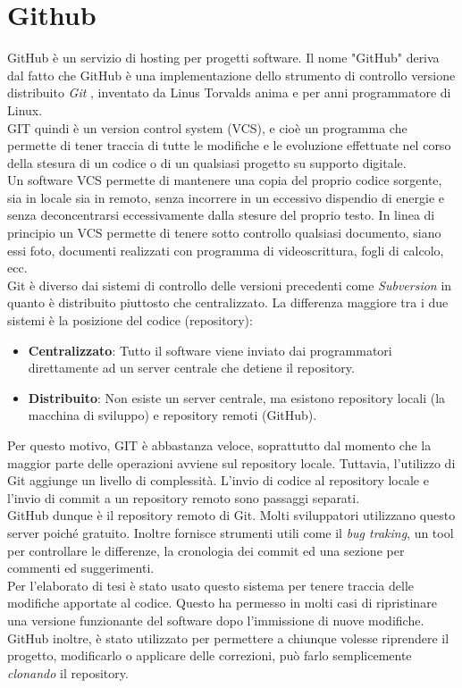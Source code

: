 \section{Github}
\label{sec:github}
GitHub è un servizio di hosting per progetti software. Il nome "GitHub" deriva dal fatto che GitHub è una implementazione dello strumento di controllo versione distribuito \textit{Git} \cite{git:wiki}, inventato da Linus Torvalds anima e per anni programmatore di Linux. 
\\ GIT quindi è un version control system (VCS), e cioè un programma che permette di tener traccia di tutte le modifiche e le evoluzione effettuate nel corso della stesura di un codice o di un qualsiasi progetto su supporto digitale.
\\ Un software VCS permette di mantenere una copia del proprio codice
sorgente, sia in locale sia in remoto, senza incorrere in un eccessivo dispendio di energie e senza deconcentrarsi eccessivamente dalla stesure del proprio testo. In linea di principio un VCS permette di tenere sotto controllo qualsiasi documento, siano essi foto, documenti realizzati con programma di videoscrittura, fogli di calcolo, ecc.
\\ Git è diverso dai sistemi di controllo delle versioni precedenti come \textit{Subversion} in quanto è distribuito piuttosto che centralizzato. La differenza maggiore tra i due sistemi è la posizione del codice (repository): 
\begin{itemize}
\item \textbf{Centralizzato}: Tutto il software viene inviato dai programmatori direttamente ad un server centrale che detiene il repository.
\item \textbf{Distribuito}: Non esiste un server centrale, ma esistono repository locali (la macchina di sviluppo) e repository remoti (GitHub).
\end{itemize}
Per questo motivo, GIT è abbastanza veloce, soprattutto dal momento che la maggior parte delle operazioni avviene sul repository locale. Tuttavia, l'utilizzo di Git aggiunge un livello di complessità. L'invio di codice al repository locale e l'invio di commit a un repository remoto sono passaggi separati.
\\ GitHub dunque è il repository remoto di Git. Molti sviluppatori utilizzano questo server poiché gratuito. Inoltre fornisce strumenti utili come il \textit{bug traking}, un tool per controllare le differenze, la cronologia dei commit ed una sezione per commenti ed suggerimenti.
\\ Per l'elaborato di tesi è stato usato questo sistema per tenere traccia delle modifiche apportate al codice. Questo ha permesso in molti casi di ripristinare una versione funzionante del software dopo l'immissione di nuove modifiche. GitHub inoltre, è stato utilizzato per permettere a chiunque volesse riprendere il progetto, modificarlo o applicare delle correzioni, può farlo semplicemente \textit{clonando} il repository.
